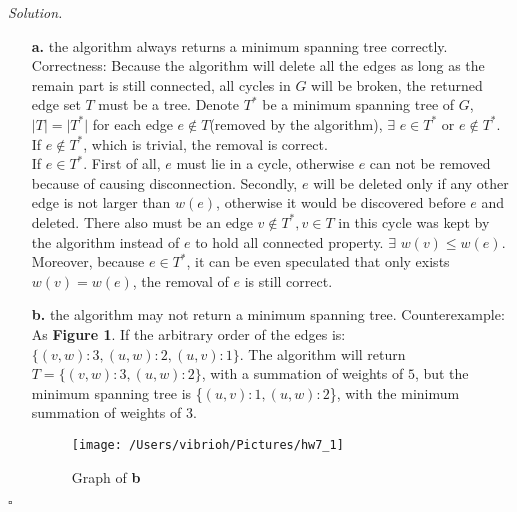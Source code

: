 \documentclass[11pt]{article}
\theoremstyle{definition}
\newenvironment{solution}{\noindent\emph{Solution.}}{\hfill$\square$}
\newcommand\tab[1][1cm]{\hspace*{#1}}
\begin{document}
\begin{solution}
\begin{enumerate}

 \item[\textbf{a.}] \tab the algorithm always returns a minimum spanning tree correctly.\\
 \tab Correctness: Because the algorithm will delete all the edges as long as the remain part is still connected, all cycles in $G$ will be broken, the returned edge set $T$ must be a tree.  Denote $T^*$ be a minimum spanning tree of $G$, $\vert T \vert = \vert T^* \vert $ for each edge $e \notin T$(removed by the algorithm), $\exists$ $e \in T^*$ or $e \notin T^*$.\\
 \tab If $e \notin T^*$, which is trivial,  the removal is correct. \\
 \tab If $e \in T^*$. First of all, $e$ must lie in a cycle, otherwise $e$ can not be removed because of causing disconnection. Secondly, $e$ will be deleted only if any other edge is not larger than $w(e)$, otherwise it would be discovered before $e$ and deleted. There also must be an edge $v \notin T^*, v\in T$ in this cycle was kept by the algorithm instead of $e$ to hold all connected property. $\exists$ $w(v) \leq w(e)$. Moreover, because $e \in T^*$,  it can be even speculated that only exists $w(v) = w(e)$, the removal of $e$ is still correct.\\

 \item[\textbf{b.}] \tab the algorithm may not return a minimum spanning tree. Counterexample: As \textbf{Figure 1}. If the arbitrary order of the edges is: $\{(v,w):3, (u,w):2, (u,v):1\}$. The algorithm will return $T = \{ (v, w):3, (u, w):2    \}$, with a summation of weights of $5$,  but the minimum spanning tree is \{$ (u,v):1, (u,w):2$\}, with the minimum summation of weights of $3$.  \\
  \begin{figure}[htbp]
  \centering
  \texttt{[image: /Users/vibrioh/Pictures/hw7\_1]}
  \caption{Graph of \textbf{b}}
  \label{fig:shapes}
\end{figure}


\end{enumerate}
\end{solution}
\end{document}
